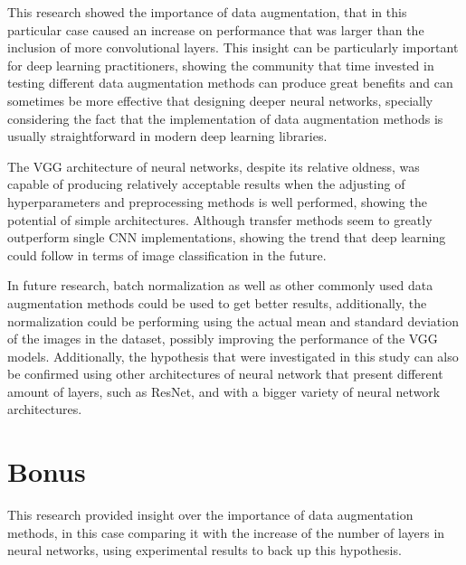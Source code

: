 \documentclass[10pt,twocolumn,letterpaper]{article}
\begin{document}
This research showed the importance of data augmentation, that in this particular case caused an increase on performance that was larger than the inclusion of more convolutional layers. This insight can be particularly important for deep learning practitioners, showing the community that time invested in testing different data augmentation methods can produce great benefits and can sometimes be more effective that designing deeper neural networks, specially considering the fact that the implementation of data augmentation methods is usually straightforward in modern deep learning libraries.

The VGG architecture of neural networks, despite its relative oldness, was capable of producing relatively acceptable results when the adjusting of hyperparameters and preprocessing methods is well performed, showing the potential of simple architectures. Although transfer methods seem to greatly outperform single CNN implementations, showing the trend that deep learning could follow in terms of image classification in the future.

In future research, batch normalization as well as other commonly used data augmentation methods could be used to get better results, additionally, the normalization could be performing using the actual mean and standard deviation of the images in the dataset, possibly improving the performance of the VGG models. Additionally, the hypothesis that were investigated in this study can also be confirmed using other architectures of neural network that present different amount of layers, such as ResNet, and with a bigger variety of neural network architectures.


\section{Bonus}

This research provided insight over the importance of data augmentation methods, in this case comparing it with the increase of the number of layers in neural networks, using experimental results to back up this hypothesis.

{\small


}
\end{document}
